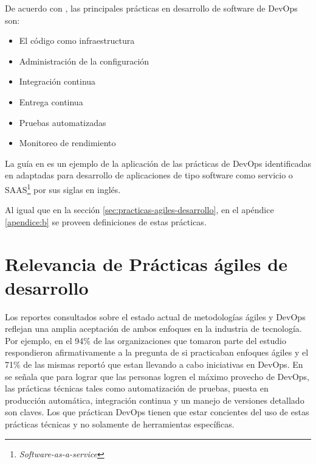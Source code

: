 De acuerdo con \cite{jabbari-et-al}, las principales prácticas en desarrollo de software de DevOps son:
\begin{itemize}
    \item El código como infraestructura
    \item Administración de la configuración
    \item Integración continua
    \item Entrega continua
    \item Pruebas automatizadas
    \item Monitoreo de rendimiento
\end{itemize}
La guía en \cite{wiggins} es un ejemplo de la aplicación de las prácticas de DevOps identificadas en \cite{jabbari-et-al} adaptadas para desarrollo de aplicaciones de tipo software como servicio o SAAS\footnote{\emph{Software-as-a-service}} por sus siglas en inglés.

Al igual que en la sección \ref{sec:practicas-agiles-desarrollo}, en el apéndice \ref{apendice:b} se proveen definiciones de estas prácticas.

\section{Relevancia de Prácticas ágiles de desarrollo} \label{sec:relevancia-agile}
Los reportes consultados sobre el estado actual de metodologías ágiles\cite{version-one} y DevOps\cite{puppet-devops} reflejan una amplia aceptación de ambos enfoques en la industria de tecnología. Por ejemplo, en \cite{version-one} el 94\% de las organizaciones que tomaron parte del estudio respondieron afirmativamente a la pregunta de si practicaban enfoques ágiles y el 71\% de las mismas reportó que estan llevando a cabo iniciativas en DevOps. En \cite{puppet-devops} se señala que para lograr que las personas logren el máximo provecho de DevOps, las prácticas técnicas tales como automatización de pruebas, puesta en producción automática, integración continua y un manejo de versiones detallado son claves. Los que práctican DevOps tienen que estar concientes del uso de estas prácticas técnicas y no solamente de herramientas específicas. 

